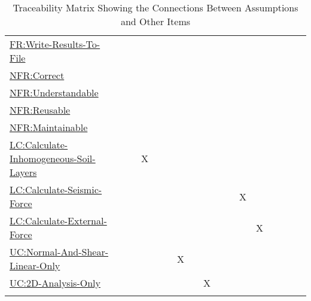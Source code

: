 \documentclass[12pt]{article}
\begin{document}
\begin{longtable}{l l l l l l l l l l l l l l l l l}
\hyperref[writeToFile]{FR:Write-Results-To-File} &  &  &  &  &  &  &  &  &  &  &  &  &  &  &  & 
\\
\hyperref[correct]{NFR:Correct} &  &  &  &  &  &  &  &  &  &  &  &  &  &  &  & 
\\
\hyperref[understandable]{NFR:Understandable} &  &  &  &  &  &  &  &  &  &  &  &  &  &  &  & 
\\
\hyperref[reusable]{NFR:Reusable} &  &  &  &  &  &  &  &  &  &  &  &  &  &  &  & 
\\
\hyperref[maintainable]{NFR:Maintainable} &  &  &  &  &  &  &  &  &  &  &  &  &  &  &  & 
\\
\hyperref[LC_inhomogeneous]{LC:Calculate-Inhomogeneous-Soil-Layers} &  &  & X &  &  &  &  &  &  &  &  &  &  &  &  & 
\\
\hyperref[LC_seismic]{LC:Calculate-Seismic-Force} &  &  &  &  &  &  &  &  &  &  & X &  &  &  &  & 
\\
\hyperref[LC_external]{LC:Calculate-External-Force} &  &  &  &  &  &  &  &  &  &  &  & X &  &  &  & 
\\
\hyperref[UC_normshearlinear]{UC:Normal-And-Shear-Linear-Only} &  &  &  &  &  & X &  &  &  &  &  &  &  &  &  & 
\\
\hyperref[UC_2donly]{UC:2D-Analysis-Only} &  &  &  &  &  &  &  & X &  &  &  &  &  &  &  & 
\\
\bottomrule
\caption{Traceability Matrix Showing the Connections Between Assumptions and Other Items}
\label{Table:TraceMatAvsAll}
\end{longtable}
\end{document}
